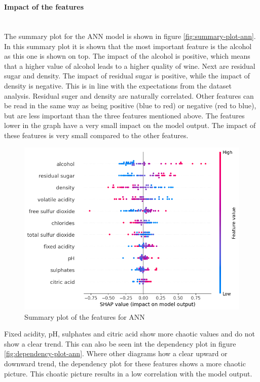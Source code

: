 \documentclass{article}
\newcommand{\subsubsubsection}[1]{%
  \paragraph{#1}\mbox{}\\}
\begin{document}
\subsubsubsection{Impact of the features}
The summary plot for the ANN model is shown in figure \autoref{fig:summary-plot-ann}.
In this summary plot it is shown that the most important feature is the alcohol as this one is shown on top.
The impact of the alcohol is positive, which means that a higher value of alcohol leads to a higher quality of wine.
Next are residual sugar and density. The impact of residual sugar is positive, while the impact of density is negative.
This is in line with the expectations from the dataset analysis. Residual suger and density are naturally correlated.
Other features can be read in the same way as being positive (blue to red) or negative (red to blue), but are less important than the three features mentioned above.
The features lower in the graph have a very small impact on the model output.
The impact of these features is very small compared to the other features.

\begin{figure}
	\centering
	\includegraphics[width=\linewidth]{figures/shap-summary-ann.png}
	\caption{Summary plot of the features for ANN}
	\label{fig:summary-plot-ann}
\end{figure}

Fixed acidity, pH, sulphates and citric acid show more chaotic values and do not show a clear trend.
This can also be seen int the dependency plot in figure \autoref{fig:dependency-plot-ann}.
Where other diagrams how a clear upward or downward trend, the dependency plot for these features shows a more chaotic picture.
This choatic picture results in a low correlation with the model output.
\end{document}

